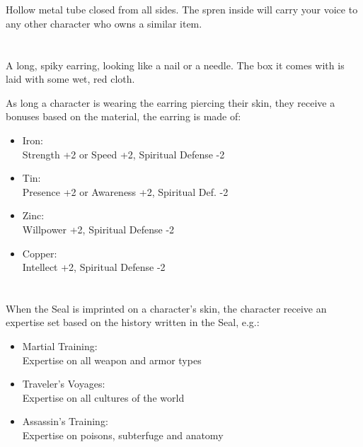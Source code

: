 \section{\lootSeonTube}

Hollow metal tube closed from all sides. The spren inside will carry your voice to any other character who owns a similar item.




\section{\lootHemalurgicNail}

A long, spiky earring, looking like a nail or a needle. The box it comes with is laid with some wet, red cloth.

As long a character is wearing the earring piercing their skin, they receive a bonuses based on the material, the earring is made of:

\begin{itemize}
	\item Iron: \\Strength +2 or Speed +2, Spiritual Defense -2
	\item Tin: \\Presence +2 or Awareness +2, Spiritual Def. -2
	\item Zinc: \\Willpower +2, Spiritual Defense -2
	\item Copper: \\Intellect +2, Spiritual Defense -2
\end{itemize}



\section{\lootForgerySeal}

When the Seal is imprinted on a character’s skin, the character receive an expertise set based on the history written in the Seal, e.g.:

\begin{itemize}
	\item Martial Training: \\Expertise on all weapon and armor types
	\item Traveler’s Voyages: \\Expertise on all cultures of the world
	\item Assassin’s Training: \\Expertise on poisons, subterfuge and anatomy
\end{itemize}



